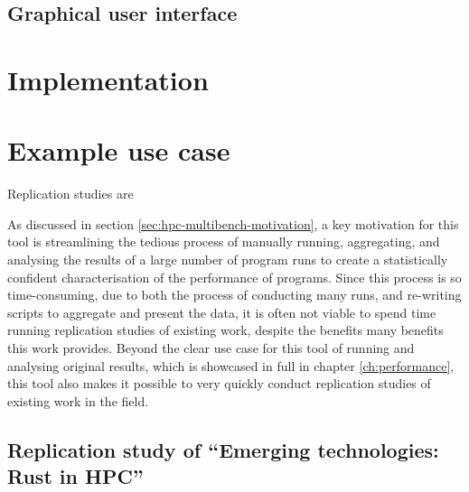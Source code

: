 \subsection{Graphical user interface}
\label{sec:hpc-multibench-gui-design}

\section{Implementation}
\label{sec:hpc-multibench-implementation} %






\section{Example use case}
\label{sec:hpc-multibench-example-use-case} %


Replication studies are

As discussed in section \ref{sec:hpc-multibench-motivation}, a key motivation for this tool is streamlining the tedious process of manually running, aggregating, and analysing the results of a large number of program runs to create a statistically confident characterisation of the performance of programs. Since this process is so time-consuming, due to both the process of conducting many runs, and re-writing scripts to aggregate and present the data, it is often not viable to spend time running replication studies of existing work, despite the benefits many benefits this work provides. Beyond the clear use case for this tool of running and analysing original results, which is showcased in full in chapter \ref{ch:performance}, this tool also makes it possible to very quickly conduct replication studies of existing work in the field.

\subsection{Replication study of ``Emerging technologies: Rust in HPC''}
\label{ssec:hpc-multibench-replication-study}

